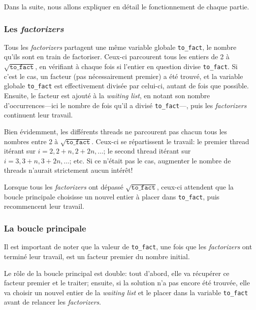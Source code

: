 \documentclass[a4paper,10pt]{article}
\begin{document}
Dans la suite, nous allons expliquer en détail le fonctionnement de chaque partie.

\subsubsection*{Les \emph{factorizers}}

Tous les \emph{factorizers} partagent une même variable globale \texttt{to\_fact}, le nombre qu'ils sont en train de factoriser. Ceux-ci parcourent tous les entiers de 2 à $\sqrt{\texttt{to\_fact}}$, en vérifiant à chaque fois si l'entier en question divise \texttt{to\_fact}. Si c'est le cas, un facteur (pas nécessairement premier) a été trouvé, et la variable globale \texttt{to\_fact} est effectivement divisée par celui-ci, autant de fois que possible. Ensuite, le facteur est ajouté à la \emph{waiting list}, en notant son nombre d'occurrences---ici le nombre de fois qu'il a divisé \texttt{to\_fact}---, puis les \emph{factorizers} continuent leur travail.

Bien évidemment, les différents threads ne parcourent pas chacun tous les nombres entre 2 à $\sqrt{\texttt{to\_fact}}$. Ceux-ci se répartissent le travail: le premier thread itérant sur $i=2,2+n,2+2n,\dots$; le second thread itérant sur $i=3,3+n,3+2n,\dots$; etc. Si ce n'était pas le cas, augmenter le nombre de threads n'aurait strictement aucun intérêt!

Lorsque tous les \emph{factorizers} ont dépassé $\sqrt{\texttt{to\_fact}}$, ceux-ci attendent que la boucle principale choisisse un nouvel entier à placer dans \texttt{to\_fact}, puis recommencent leur travail.

\subsubsection*{La boucle principale}

Il est important de noter que la valeur de \texttt{to\_fact}, une fois que les \emph{factorizers} ont terminé leur travail, est un facteur premier du nombre initial. %

Le rôle de la boucle principal est double: tout d'abord, elle va récupérer ce facteur premier et le traiter; ensuite, si la solution n'a pas encore été trouvée, elle va choisir un nouvel entier de la \emph{waiting list} et le placer dans la variable \texttt{to\_fact} avant de relancer les \emph{factorizers}.
\end{document}
